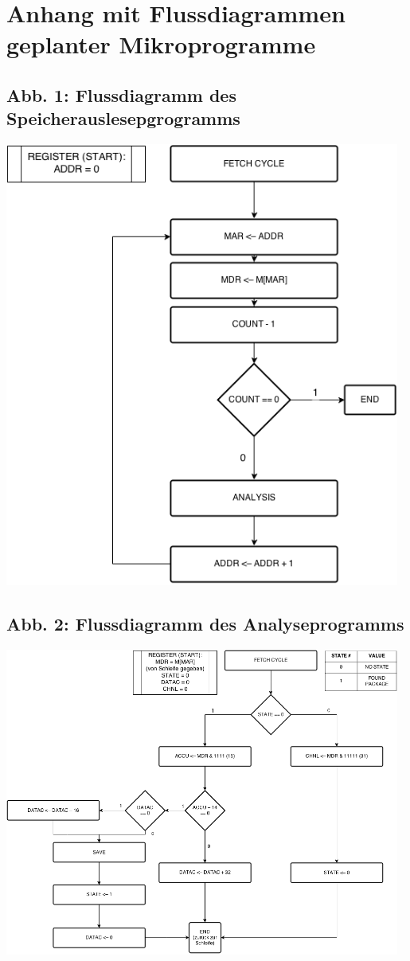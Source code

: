 \documentclass[12pt,titlepage]{article}
\begin{document}
\section{Anhang mit Flussdiagrammen \\ geplanter Mikroprogramme}

\subsection{Abb. 1: Flussdiagramm des Speicherauslesepgrogramms}

\includegraphics[width=13cm]{readFromMemory.png}

\subsection{Abb. 2: Flussdiagramm des Analyseprogramms}
\includegraphics[width=13cm]{analyseData.png}
\end{document}
